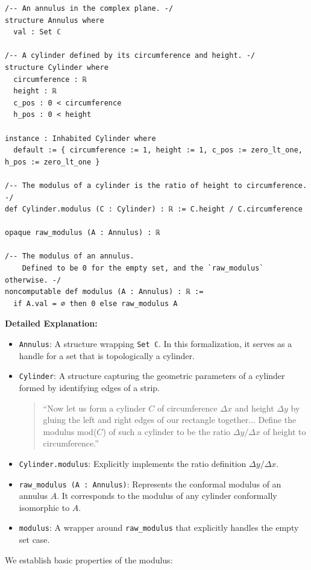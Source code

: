 \begin{lstlisting}[language=Lean]
/-- An annulus in the complex plane. -/
structure Annulus where
  val : Set ℂ

/-- A cylinder defined by its circumference and height. -/
structure Cylinder where
  circumference : ℝ
  height : ℝ
  c_pos : 0 < circumference
  h_pos : 0 < height

instance : Inhabited Cylinder where
  default := { circumference := 1, height := 1, c_pos := zero_lt_one, h_pos := zero_lt_one }

/-- The modulus of a cylinder is the ratio of height to circumference. -/
def Cylinder.modulus (C : Cylinder) : ℝ := C.height / C.circumference

opaque raw_modulus (A : Annulus) : ℝ

/-- The modulus of an annulus.
    Defined to be 0 for the empty set, and the `raw_modulus` otherwise. -/
noncomputable def modulus (A : Annulus) : ℝ :=
  if A.val = ∅ then 0 else raw_modulus A
\end{lstlisting}

\noindent
\textbf{Detailed Explanation:}
\begin{itemize}
    \item \texttt{Annulus}: A structure wrapping \texttt{Set ℂ}. In this formalization, it serves as a handle for a set that is topologically a cylinder.
    \item \texttt{Cylinder}: A structure capturing the geometric parameters of a cylinder formed by identifying edges of a strip.
    \begin{quote}
        ``Now let us form a cylinder $C$ of circumference $\Delta x$ and height $\Delta y$ by gluing the left and right edges of our rectangle together... Define the modulus mod($C$) of such a cylinder to be the ratio $\Delta y/\Delta x$ of height to circumference.''\cite{Milnor}
    \end{quote}
    \item \texttt{Cylinder.modulus}: Explicitly implements the ratio definition $\Delta y / \Delta x$.
    \item \texttt{raw\_modulus (A : Annulus)}: Represents the conformal modulus of an annulus $A$. It corresponds to the modulus of any cylinder conformally isomorphic to $A$.
    \item \texttt{modulus}: A wrapper around \texttt{raw\_modulus} that explicitly handles the empty set case.
\end{itemize}

We establish basic properties of the modulus:

